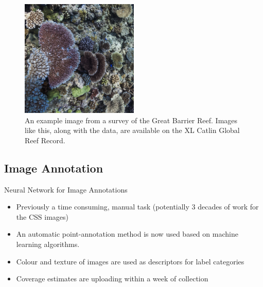 \documentclass{beamer}
\begin{document}
            \begin{frame}
                \begin{figure}
                    \centering
                    \includegraphics[width = 0.5\textwidth]{coral.jpg}
                    \caption{An example image from a survey of the Great Barrier Reef. Images like this, along with the data, are available on the XL Catlin Global Reef Record\footnotemark. }
                \end{figure}
            \end{frame}

          \subsection{Image Annotation}
              \begin{frame}{Neural Network for Image Annotations}
                \begin{itemize}
                  \item Previously a time consuming, manual task (potentially 3 decades of work for the CSS images)
                  \item An automatic point-annotation method is now used based on machine learning algorithms\footnotemark. 
                  \item Colour and texture of images are used as descriptors for label categories
                  \item Coverage estimates are uploading within a week of collection
                \end{itemize}
              \end{frame}
\end{document}
